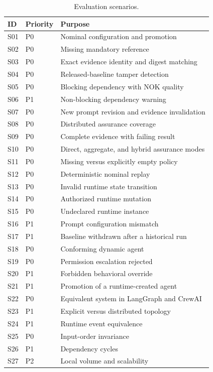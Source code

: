 \documentclass[10pt]{article}
\begin{document}
\begin{table}[h]
\centering
\caption{Evaluation scenarios.}
\begin{tabularx}{\linewidth}{llX}
\toprule
ID & Priority & Purpose \\
\midrule
S01 & P0 & Nominal configuration and promotion \\
S02 & P0 & Missing mandatory reference \\
S03 & P0 & Exact evidence identity and digest matching \\
S04 & P0 & Released-baseline tamper detection \\
S05 & P0 & Blocking dependency with NOK quality \\
S06 & P1 & Non-blocking dependency warning \\
S07 & P0 & New prompt revision and evidence invalidation \\
S08 & P0 & Distributed assurance coverage \\
S09 & P0 & Complete evidence with failing result \\
S10 & P0 & Direct, aggregate, and hybrid assurance modes \\
S11 & P0 & Missing versus explicitly empty policy \\
S12 & P0 & Deterministic nominal replay \\
S13 & P0 & Invalid runtime state transition \\
S14 & P0 & Authorized runtime mutation \\
S15 & P0 & Undeclared runtime instance \\
S16 & P1 & Prompt configuration mismatch \\
S17 & P1 & Baseline withdrawn after a historical run \\
S18 & P0 & Conforming dynamic agent \\
S19 & P0 & Permission escalation rejected \\
S20 & P1 & Forbidden behavioral override \\
S21 & P1 & Promotion of a runtime-created agent \\
S22 & P0 & Equivalent system in LangGraph and CrewAI \\
S23 & P1 & Explicit versus distributed topology \\
S24 & P1 & Runtime event equivalence \\
S25 & P0 & Input-order invariance \\
S26 & P1 & Dependency cycles \\
S27 & P2 & Local volume and scalability \\
\bottomrule
\end{tabularx}
\end{table}
\end{document}
